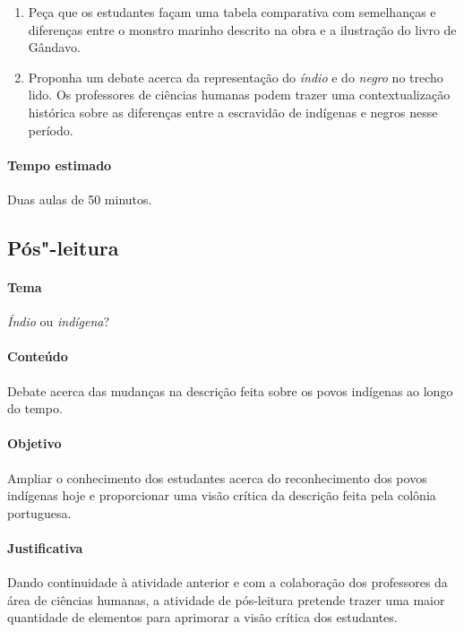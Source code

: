 \documentclass[12pt]{extarticle}
\begin{document}
\begin{enumerate}

\item Peça que os estudantes
façam uma tabela comparativa com semelhanças e diferenças entre o monstro
marinho descrito na obra e a ilustração do livro de Gândavo.

\item Proponha um debate acerca da representação do \emph{índio} e do \emph{negro} no trecho lido. Os professores de ciências humanas
podem trazer uma contextualização histórica sobre as diferenças entre a escravidão de indígenas e negros nesse período.

\end{enumerate}
\paragraph{Tempo estimado} Duas aulas de 50 minutos.


\subsection{Pós"-leitura}

\paragraph{Tema} \emph{Índio} ou \emph{indígena}?

\paragraph{Conteúdo} Debate acerca das mudanças na descrição feita sobre os povos indígenas ao longo do tempo.

\paragraph{Objetivo} Ampliar o conhecimento dos estudantes acerca do reconhecimento dos povos indígenas hoje e proporcionar uma visão crítica da descrição feita pela colônia portuguesa.

\paragraph{Justificativa} Dando continuidade à atividade anterior e com a colaboração dos professores
da área de ciências humanas, a atividade de pós-leitura pretende trazer uma maior quantidade de elementos para aprimorar a visão crítica dos estudantes.
\end{document}
